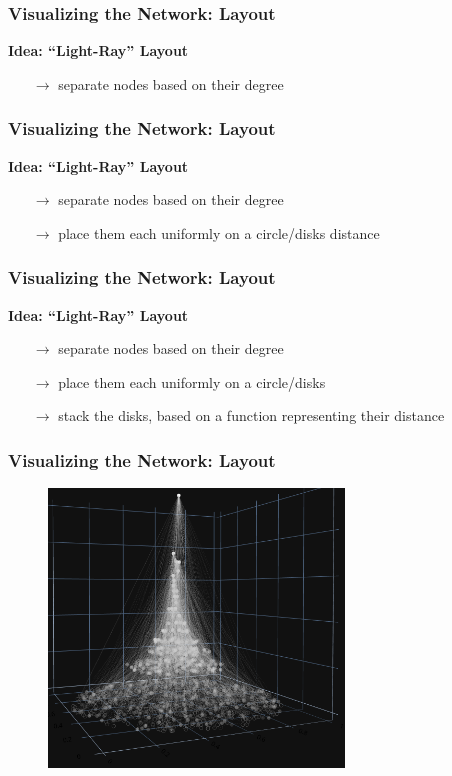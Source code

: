 \documentclass[fleqn]{beamer}
\begin{document}
    \begin{frame}
        \frametitle{Visualizing the Network: Layout}
        \centering \textbf{Idea: ``Light-Ray'' Layout}
        \begin{itemize}
            \item[$\to$] separate nodes based on their degree
        \end{itemize}
    \end{frame}

    \begin{frame}
        \frametitle{Visualizing the Network: Layout}
        \centering \textbf{Idea: ``Light-Ray'' Layout}
        \begin{itemize}
            \item[$\to$] separate nodes based on their degree
            \item[$\to$] place them each uniformly on a circle/disks
                distance
        \end{itemize}
    \end{frame}

    \begin{frame}
        \frametitle{Visualizing the Network: Layout}
        \centering \textbf{Idea: ``Light-Ray'' Layout}
        \begin{itemize}
            \item[$\to$] separate nodes based on their degree
            \item[$\to$] place them each uniformly on a circle/disks
            \item[$\to$] stack the disks, based on a function representing their
                distance
        \end{itemize}
    \end{frame}

    \begin{frame}
        \frametitle{Visualizing the Network: Layout}
        \begin{figure}[htpb]
            \centering
            \includegraphics[width=0.7\textwidth]{./pics/plot_sqrt.png}
        \end{figure}
    \end{frame}
\end{document}
